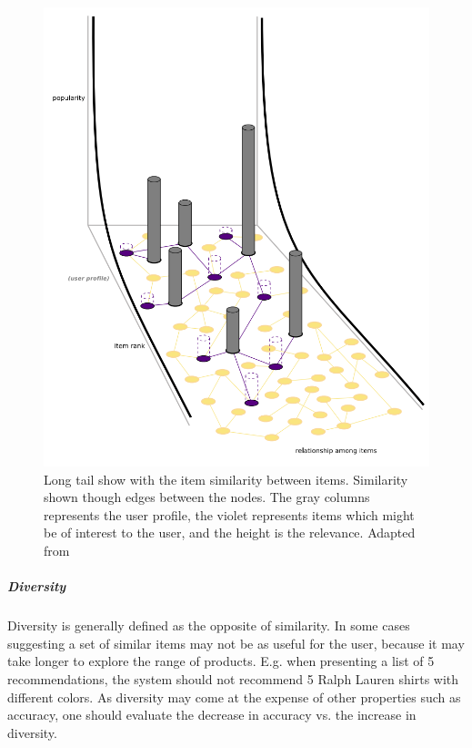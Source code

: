\begin{figure}[H]
    \includegraphics[width=5in]{image/longtailNoveltyFig.png}
    \centering
    \caption[Long tail]{Long tail show with the item similarity between items. Similarity shown though edges between the nodes. The gray columns represents the user profile, the violet represents items which might be of interest to the user, and the height is the relevance. Adapted from~\cite{celma2008}}
    \label{figure:longtailNovelty}
\end{figure}

\subparagraph{Diversity}
Diversity is generally defined as the opposite of similarity. In some cases suggesting a set of similar items may not be as useful for the user, because it may take longer to explore the range of products. E.g. when presenting a list of 5 recommendations, the system should not recommend 5 Ralph Lauren shirts with different colors. As diversity may come at the expense of other properties such as accuracy, one should evaluate the decrease in accuracy vs. the increase in diversity.

